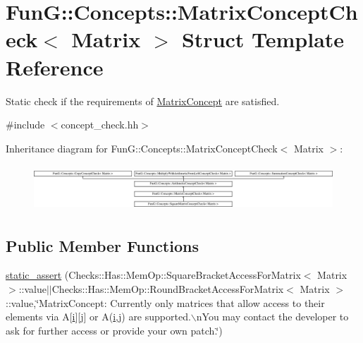 \hypertarget{structFunG_1_1Concepts_1_1MatrixConceptCheck}{\section{\-Fun\-G\-:\-:\-Concepts\-:\-:\-Matrix\-Concept\-Check$<$ \-Matrix $>$ \-Struct \-Template \-Reference}
\label{structFunG_1_1Concepts_1_1MatrixConceptCheck}
}


\-Static check if the requirements of \hyperlink{structFunG_1_1Concepts_1_1MatrixConcept}{\-Matrix\-Concept} are satisfied.  




{\ttfamily \#include $<$concept\-\_\-check.\-hh$>$}

\-Inheritance diagram for \-Fun\-G\-:\-:\-Concepts\-:\-:\-Matrix\-Concept\-Check$<$ \-Matrix $>$\-:\begin{figure}[H]
\begin{center}
\leavevmode
\includegraphics[height=1.728395cm]{structFunG_1_1Concepts_1_1MatrixConceptCheck}
\end{center}
\end{figure}
\subsection*{\-Public \-Member \-Functions}
\begin{DoxyCompactItemize}
\item 
\hyperlink{structFunG_1_1Concepts_1_1MatrixConceptCheck_afb6279b1a1638da54ecd2011d7cd3a27}{static\-\_\-assert} (\-Checks\-::\-Has\-::\-Mem\-Op\-::\-Square\-Bracket\-Access\-For\-Matrix$<$ \-Matrix $>$\-::value$|$$|$\-Checks\-::\-Has\-::\-Mem\-Op\-::\-Round\-Bracket\-Access\-For\-Matrix$<$ \-Matrix $>$\-::value,\char`\"{}\-Matrix\-Concept\-: \-Currently only matrices that allow access to their elements via \-A\mbox{[}\hyperlink{namespaceFunG_a596429cd53658fe4796a76dd39d6a8da}{i}\mbox{]}\mbox{[}j\mbox{]} or \-A(\hyperlink{namespaceFunG_a596429cd53658fe4796a76dd39d6a8da}{i},j) are supported.$\backslash$n\-You may contact the developer to ask for further access or provide your own patch.\char`\"{})
\end{DoxyCompactItemize}


